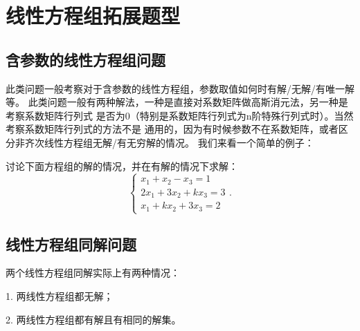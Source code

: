 \section{线性方程组拓展题型}
\subsection{含参数的线性方程组问题}
此类问题一般考察对于含参数的线性方程组，参数取值如何时有解/无解/有唯一解等。
此类问题一般有两种解法，一种是直接对系数矩阵做高斯消元法，另一种是考察系数矩阵行列式
是否为0（特别是系数矩阵行列式为n阶特殊行列式时）。当然考察系数矩阵行列式的方法不是
通用的，因为有时候参数不在系数矩阵，或者区分非齐次线性方程组无解/有无穷解的情况。
我们来看一个简单的例子：
\begin{example}
	讨论下面方程组的解的情况，并在有解的情况下求解：$$\begin{cases}
		x_1+x_2-x_3=1 \\ 2x_1+3x_2+kx_3=3 \\ x_1+kx_2+3x_3=2
	\end{cases}.$$
\end{example}
\subsection{线性方程组同解问题}
两个线性方程组同解实际上有两种情况：

1. 两线性方程组都无解；

2. 两线性方程组都有解且有相同的解集。

